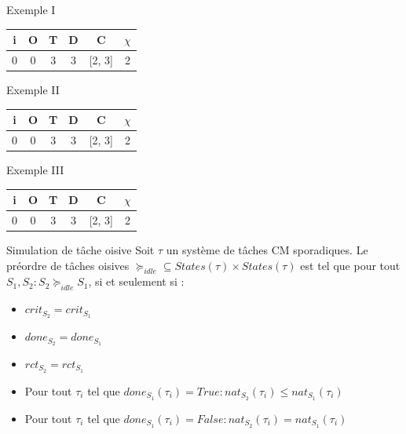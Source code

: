 \documentclass{bredelebeamer}
\begin{document}
\begin{frame}{Exemple I}
\centering
\begin{tabular}{|c|c|c|c|c|c|}
\hline
i &O & T & D & C & $\chi$\\
\hline
0 & 0 & 3 & 3 & [2, 3]& 2\\
\hline
\end{tabular}
\begin{figure}[h]
    \centering
    \resizebox{\textwidth-1cm}{!}{
    \fontsize{28pt}{12pt}\selectfont
    
    }
\end{figure}
\end{frame}

\begin{frame}{Exemple II}
\centering
\begin{tabular}{|c|c|c|c|c|c|}
\hline
i &O & T & D & C & $\chi$\\
\hline
0 & 0 & 3 & 3 & [2, 3]& 2\\
\hline
\end{tabular}
\begin{figure}[h]
    \centering
    \resizebox{\textwidth-1cm}{!}{
    \fontsize{28pt}{12pt}\selectfont
    
    }
\end{figure}

\end{frame}

\begin{frame}{Exemple III}
\centering
\begin{tabular}{|c|c|c|c|c|c|}
\hline
i &O & T & D & C & $\chi$\\
\hline
0 & 0 & 3 & 3 & [2, 3]& 2\\
\hline
\end{tabular}
\begin{figure}[h]
    \centering
    \resizebox{\textwidth-1cm}{!}{
    \fontsize{28pt}{12pt}\selectfont
    
    }
\end{figure}

\end{frame}


\begin{frame}{Simulation de tâche oisive}
Soit $\tau$ un système de tâches CM sporadiques. Le préordre de tâches oisives $\succeq_{idle} \subseteq States(\tau)\times States(\tau)$ est tel que pour tout $S_1, S_2 : S_2 \succeq_{idle}S_1$, si et seulement si :
\begin{itemize}
\item $crit_{S_2} = crit_{S_1}$
\item $done_{S_2} = done_{S_1}$
\item $rct_{S_2} = rct_{S_1}$
\item Pour tout $\tau_i$ tel que $done_{S_1}(\tau_i) = True : nat_{S_2}(\tau_i) \leq nat_{S_1}(\tau_i)$
\item Pour tout $\tau_i$ tel que $done_{S_1}(\tau_i) = False : nat_{S_2}(\tau_i) = nat_{S_1}(\tau_i)$\\
\end{itemize}
\end{frame}
\end{document}
